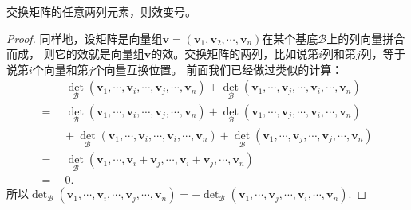 \documentclass[12pt,UTF8]{ctexbook}
\begin{document}
\begin{pp}\label{pp:10_37}
    交换矩阵的任意两列元素，则效变号。
\end{pp}
\begin{proof} %
    同样地，设矩阵是向量组$\mathbf{v} = (\mathbf{v}_1, \mathbf{v}_2, \cdots , \mathbf{v}_n)$在某个基底$\mathcal{B}$上的列向量拼合而成，
    则它的效就是向量组$\mathbf{v}$的效。交换矩阵的两列，比如说第$i$列和第$j$列，等于说第$i$个向量和第$j$个向量互换位置。
    前面我们已经做过类似的计算：
    \begin{align*}
        & \,\,\,\det_\mathcal{B} (\mathbf{v}_1,  \cdots , \mathbf{v}_i, \cdots , \mathbf{v}_j, \cdots , \mathbf{v}_n) + \det_\mathcal{B} (\mathbf{v}_1,  \cdots , \mathbf{v}_j, \cdots , \mathbf{v}_i, \cdots , \mathbf{v}_n)  \\
        =& \,\,\, \det_\mathcal{B} (\mathbf{v}_1,  \cdots , \mathbf{v}_i, \cdots , \mathbf{v}_j, \cdots , \mathbf{v}_n) + \det_\mathcal{B} (\mathbf{v}_1,  \cdots , \mathbf{v}_j, \cdots , \mathbf{v}_i, \cdots , \mathbf{v}_n)  \\
        & \,\, + \det_\mathcal{B} (\mathbf{v}_1,  \cdots , \mathbf{v}_i, \cdots , \mathbf{v}_i, \cdots , \mathbf{v}_n) + \det_\mathcal{B} (\mathbf{v}_1,  \cdots , \mathbf{v}_j, \cdots , \mathbf{v}_j, \cdots , \mathbf{v}_n)  \\
        =& \,\,\,\det_\mathcal{B} (\mathbf{v}_1,  \cdots , \mathbf{v}_i + \mathbf{v}_j, \cdots , \mathbf{v}_i + \mathbf{v}_j, \cdots , \mathbf{v}_n)  \\
        =& \,\,\, 0. 
    \end{align*}
    所以$ \det_\mathcal{B} (\mathbf{v}_1,  \cdots , \mathbf{v}_i, \cdots , \mathbf{v}_j, \cdots , \mathbf{v}_n) = - \det_\mathcal{B} (\mathbf{v}_1,  \cdots , \mathbf{v}_j, \cdots , \mathbf{v}_i, \cdots , \mathbf{v}_n). $
\end{proof}
\end{document}

